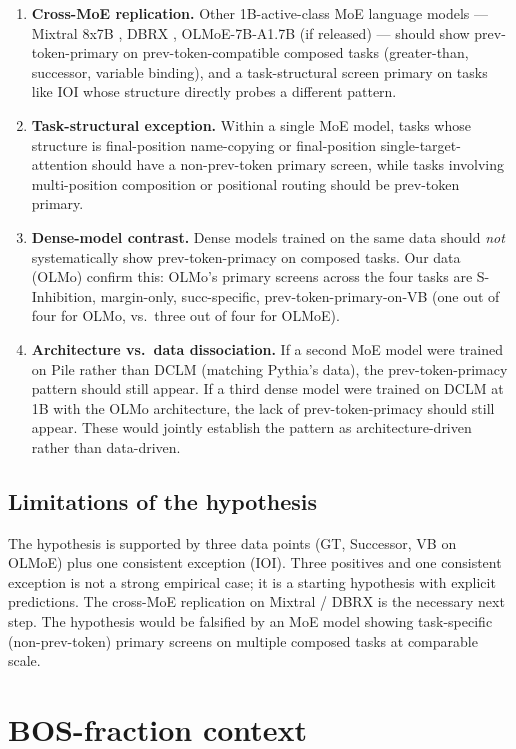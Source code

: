 \documentclass[11pt]{article}
\begin{document}
\begin{enumerate}[topsep=2pt,itemsep=2pt]
\item \textbf{Cross-MoE replication.} Other 1B-active-class MoE language models --- Mixtral 8x7B \citep{jiang2024mixtral}, DBRX \citep{databricks2024dbrx}, OLMoE-7B-A1.7B (if released) --- should show prev-token-primary on prev-token-compatible composed tasks (greater-than, successor, variable binding), and a task-structural screen primary on tasks like IOI whose structure directly probes a different pattern.
\item \textbf{Task-structural exception.} Within a single MoE model, tasks whose structure is final-position name-copying or final-position single-target-attention should have a non-prev-token primary screen, while tasks involving multi-position composition or positional routing should be prev-token primary.
\item \textbf{Dense-model contrast.} Dense models trained on the same data should \emph{not} systematically show prev-token-primacy on composed tasks. Our data (OLMo) confirm this: OLMo's primary screens across the four tasks are S-Inhibition, margin-only, succ-specific, prev-token-primary-on-VB (one out of four for OLMo, vs.\ three out of four for OLMoE).
\item \textbf{Architecture vs.\ data dissociation.} If a second MoE model were trained on Pile rather than DCLM (matching Pythia's data), the prev-token-primacy pattern should still appear. If a third dense model were trained on DCLM at 1B with the OLMo architecture, the lack of prev-token-primacy should still appear. These would jointly establish the pattern as architecture-driven rather than data-driven.
\end{enumerate}

\subsection{Limitations of the hypothesis}

The hypothesis is supported by three data points (GT, Successor, VB on OLMoE) plus one consistent exception (IOI). Three positives and one consistent exception is not a strong empirical case; it is a starting hypothesis with explicit predictions. The cross-MoE replication on Mixtral / DBRX is the necessary next step. The hypothesis would be falsified by an MoE model showing task-specific (non-prev-token) primary screens on multiple composed tasks at comparable scale.

\section{BOS-fraction context}
\label{sec:bos}
\end{document}

